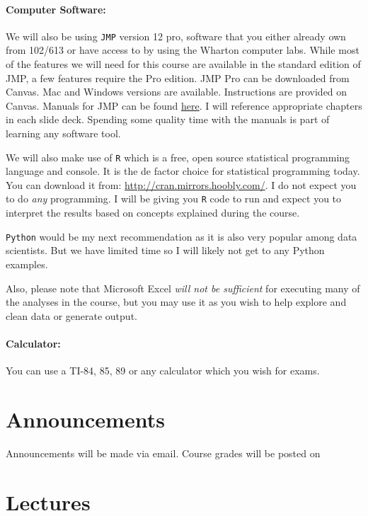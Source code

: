 \documentclass[12pt]{article}
\begin{document}
\paragraph{Computer Software:} We will also be using \texttt{JMP} version 12 pro, software that you either already own from 102/613 or have access to by using the Wharton computer labs. While most of the features we will need for this course are available in the standard edition of JMP, a few features require the Pro edition. JMP Pro can be downloaded from Canvas. Mac and Windows versions are available. Instructions are provided on Canvas. Manuals for JMP can be found \href{http://www.jmp.com/support/help/Fitting_Linear_Models.shtml}{here}. I will reference appropriate chapters in each slide deck. Spending some quality time with the manuals is part of learning any software tool.

We will also make use of \texttt{R} which is a free, open source statistical programming language and console. It is the de factor choice for statistical programming today. You can download it from: \url{http://cran.mirrors.hoobly.com/}. I do not expect you to do \textit{any} programming. I will be giving you \texttt{R} code to run and expect you to interpret the results based on concepts explained during the course.

\texttt{Python} would be my next recommendation as it is also very popular among data scientists. But we have limited time so I will likely not get to any Python examples.

Also, please note that Microsoft Excel \textit{will not be sufficient} for executing many of the analyses in the course, but you may use it as you wish to help explore and clean data or generate output. 

\paragraph{Calculator:} You can use a TI-84, 85, 89 or any calculator which you wish for exams.

\section*{Announcements}

Announcements will be made via email. Course grades will be posted on 

\section*{Lectures}
\end{document}

